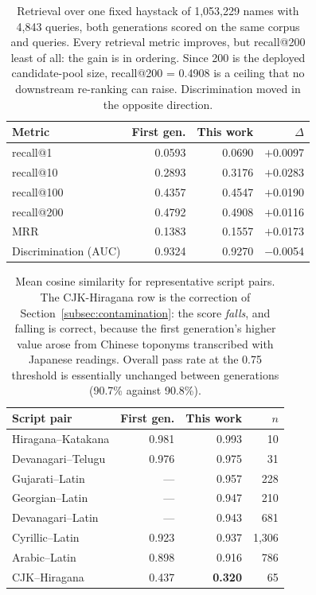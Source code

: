 \documentclass[11pt,a4paper]{article}
\begin{document}
\clearpage

\begin{table}[p]
\centering
\small
\begin{tabular}{lrrr}
\toprule
\textbf{Metric} & \textbf{First gen.} & \textbf{This work} & \textbf{$\Delta$} \\
\midrule
recall@1    & 0.0593 & 0.0690 & $+$0.0097 \\
recall@10   & 0.2893 & 0.3176 & $+$0.0283 \\
recall@100  & 0.4357 & 0.4547 & $+$0.0190 \\
recall@200  & 0.4792 & 0.4908 & $+$0.0116 \\
MRR         & 0.1383 & 0.1557 & $+$0.0173 \\
\midrule
Discrimination (AUC) & 0.9324 & 0.9270 & $-$0.0054 \\
\bottomrule
\end{tabular}
\caption{Retrieval over one fixed haystack of 1,053,229 names with 4,843 queries, both generations scored on the same corpus and queries. Every retrieval metric improves, but recall@200 least of all: the gain is in ordering. Since 200 is the deployed candidate-pool size, recall@200 = 0.4908 is a ceiling that no downstream re-ranking can raise. Discrimination moved in the opposite direction.}
\label{tab:retrieval}
\end{table}

\clearpage

\begin{table}[p]
\centering
\small
\begin{tabular}{lrrr}
\toprule
\textbf{Script pair} & \textbf{First gen.} & \textbf{This work} & \textbf{$n$} \\
\midrule
Hiragana--Katakana   & 0.981 & 0.993 & 10 \\
Devanagari--Telugu   & 0.976 & 0.975 & 31 \\
Gujarati--Latin      & ---   & 0.957 & 228 \\
Georgian--Latin      & ---   & 0.947 & 210 \\
Devanagari--Latin    & ---   & 0.943 & 681 \\
Cyrillic--Latin      & 0.923 & 0.937 & 1,306 \\
Arabic--Latin        & 0.898 & 0.916 & 786 \\
\midrule
CJK--Hiragana        & 0.437 & \textbf{0.320} & 65 \\
\bottomrule
\end{tabular}
\caption{Mean cosine similarity for representative script pairs. The CJK-Hiragana row is the correction of Section~\ref{subsec:contamination}: the score \emph{falls}, and falling is correct, because the first generation's higher value arose from Chinese toponyms transcribed with Japanese readings. Overall pass rate at the 0.75 threshold is essentially unchanged between generations (90.7\% against 90.8\%).}
\label{tab:scriptpairs}
\end{table}
\end{document}
